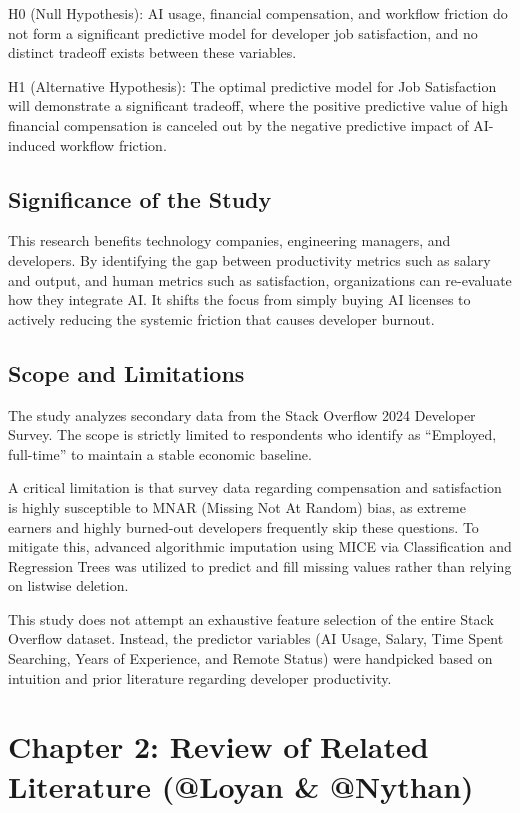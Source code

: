 \documentclass[
]{article}
\begin{document}
H0 (Null Hypothesis): AI usage, financial compensation, and workflow
friction do not form a significant predictive model for developer job
satisfaction, and no distinct tradeoff exists between these variables.

H1 (Alternative Hypothesis): The optimal predictive model for Job
Satisfaction will demonstrate a significant tradeoff, where the positive
predictive value of high financial compensation is canceled out by the
negative predictive impact of AI-induced workflow friction.

\subsection{Significance of the Study}\label{significance-of-the-study}

This research benefits technology companies, engineering managers, and
developers. By identifying the gap between productivity metrics such as
salary and output, and human metrics such as satisfaction, organizations
can re-evaluate how they integrate AI. It shifts the focus from simply
buying AI licenses to actively reducing the systemic friction that
causes developer burnout.

\subsection{Scope and Limitations}\label{scope-and-limitations}

The study analyzes secondary data from the Stack Overflow 2024 Developer
Survey. The scope is strictly limited to respondents who identify as
``Employed, full-time'' to maintain a stable economic baseline.

A critical limitation is that survey data regarding compensation and
satisfaction is highly susceptible to MNAR (Missing Not At Random) bias,
as extreme earners and highly burned-out developers frequently skip
these questions. To mitigate this, advanced algorithmic imputation using
MICE via Classification and Regression Trees was utilized to predict and
fill missing values rather than relying on listwise deletion.

This study does not attempt an exhaustive feature selection of the
entire Stack Overflow dataset. Instead, the predictor variables (AI
Usage, Salary, Time Spent Searching, Years of Experience, and Remote
Status) were handpicked based on intuition and prior literature
regarding developer productivity.

\section{Chapter 2: Review of Related Literature (@Loyan \&
@Nythan)}\label{chapter-2-review-of-related-literature-loyan-nythan}
\end{document}

